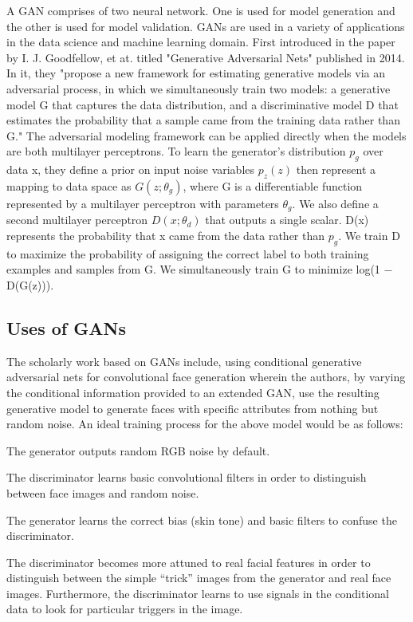 \documentclass[conference]{IEEEtran}
\begin{document}
A GAN comprises of two neural network. One is used for model generation and the other is used for model validation. GANs are used in a variety of applications in the data science and machine learning domain. First introduced in the paper by I. J. Goodfellow, et at. titled "Generative Adversarial Nets" published in 2014. In it, they "propose a new framework for estimating generative models via an adversarial
process, in which we simultaneously train two models: a generative model G
that captures the data distribution, and a discriminative model D that estimates
the probability that a sample came from the training data rather than G." The adversarial modeling framework can be applied directly when the models are both
multilayer perceptrons. To learn the generator’s distribution $p_{g}$ over data x, they define a prior on input noise variables $p_{z}(z)$ then represent a mapping to data space as $G(z; \theta_{g})$, where G is a
differentiable function represented by a multilayer perceptron with parameters $θ_{g}$. We also define a
second multilayer perceptron $D(x; θ_{d})$ that outputs a single scalar. D(x) represents the probability
that x came from the data rather than $p_{g}$. We train D to maximize the probability of assigning the
correct label to both training examples and samples from G. We simultaneously train G to minimize
log(1 − D(G(z))). 
\cite{b1}\newline 

\subsection{Uses of GANs}

The scholarly work based on GANs include, using conditional generative adversarial nets for convolutional face generation wherein the authors, by varying the conditional information provided to an
extended GAN, use the resulting generative model
to generate faces with specific attributes from nothing but
random noise. 
An ideal training process for the above model would be
as follows: \begin{list}{*}{spacing}
	\item The generator outputs random RGB noise by default.
	\item The discriminator learns basic convolutional filters in
	order to distinguish between face images and random
	noise.
	\item The generator learns the correct bias (skin tone) and
	basic filters to confuse the discriminator.
	\item  The discriminator becomes more attuned to real facial
	features in order to distinguish between the simple
	“trick” images from the generator and real face images.
	Furthermore, the discriminator learns to use signals in
	the conditional data to look for particular triggers in
	the image.
\end{list} 
\end{document}
